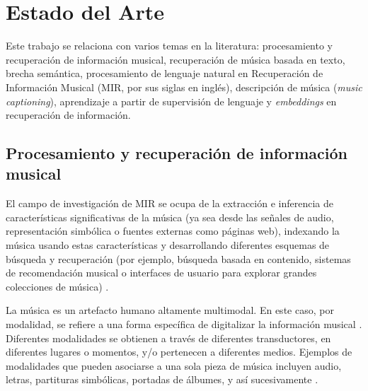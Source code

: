 \chapter{Estado del Arte}
\label{chap:sota}

Este trabajo se relaciona con varios temas en la literatura: procesamiento y recuperación de información musical, recuperación de música basada en texto, brecha semántica, procesamiento de lenguaje natural en Recuperación de Información Musical (MIR, por sus siglas en inglés), descripción de música (\textit{music captioning}), aprendizaje a partir de supervisión de lenguaje y \textit{embeddings} en recuperación de información.\\

\section{Procesamiento y recuperación de información musical}
\label{sec:MIR}

El campo de investigación de MIR se ocupa de la extracción e inferencia de características significativas de la música (ya sea desde las señales de audio, representación simbólica o fuentes externas como páginas web), indexando la música usando estas características y desarrollando diferentes esquemas de búsqueda y recuperación (por ejemplo, búsqueda basada en contenido, sistemas de recomendación musical o interfaces de usuario para explorar grandes colecciones de música) \cite{Schedl2014MusicIR}.

La música es un artefacto humano altamente multimodal. En este caso, por modalidad, se refiere a una forma específica de digitalizar la información musical \cite{Simonetta2019MultimodalMI}. Diferentes modalidades se obtienen a través de diferentes transductores, en diferentes lugares o momentos, y/o pertenecen a diferentes medios. Ejemplos de modalidades que pueden asociarse a una sola pieza de música incluyen audio, letras, partituras simbólicas, portadas de álbumes, y así sucesivamente \cite{Simonetta2019MultimodalMI, Schedl2014MusicIR}.

